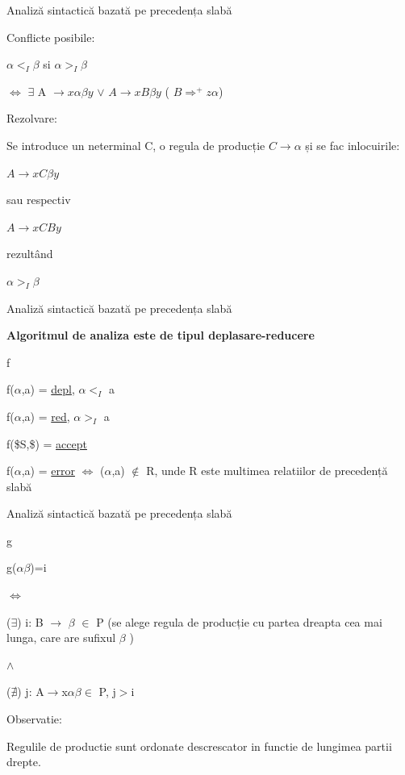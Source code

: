 \documentclass[pdf]{beamer}
\begin{document}
\begin{frame}{Analiză sintactică bazată pe precedența slabă}

Conflicte posibile:
\newline

$\alpha <_{I} \beta$ si $\alpha >_{I} \beta$

$\iff$ $\exists$ A $\rightarrow  x \alpha\beta y$ $\lor$ $A \rightarrow  xB \beta y $
( $B{\Rightarrow}^+z\alpha$)
\newline

Rezolvare:
\newline

Se introduce un neterminal C, o regula de producție $C \rightarrow \alpha$ și se fac inlocuirile:

$A \rightarrow x C \beta y$

sau respectiv

$A \rightarrow x C B y$ 

rezultând

$\alpha >_{I} \beta$
\end{frame}



\begin{frame}{Analiză sintactică bazată pe precedența slabă}

\textbf{ Algoritmul de analiza este de tipul deplasare-reducere}
\newline

f
\newline

f($\alpha$,a) = \underline{depl}, $\alpha <_{I}$ a

f($\alpha$,a) = \underline{red}, $\alpha >_{I}$ a

f(\$S,\$) = \underline{accept}

f($\alpha$,a) = \underline{error} $\iff$ ($\alpha$,a) $\notin$ R, unde R este multimea relatiilor de precedență slabă

\end{frame}



\begin{frame}{Analiză sintactică bazată pe precedența slabă}

g
\newline

g($\alpha\beta$)=i 

$\iff$

($\exists$) i: B $\rightarrow$ $\beta$ $\in$ P (se alege regula de producție cu partea dreapta cea mai lunga, care are sufixul $\beta$ )

$\land$

($\nexists$) j: A$\rightarrow$x$\alpha\beta\in$ P, j$>$i
\newline

Observatie:

Regulile de productie sunt ordonate descrescator in functie de lungimea partii drepte.

\end{frame}
\end{document}
